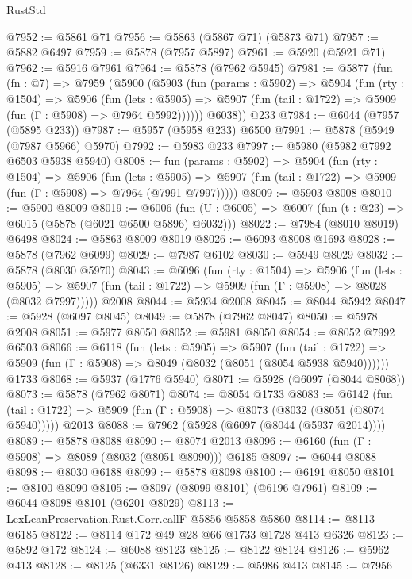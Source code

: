 \begin{lexlean}{RustStd}
\begin{coremodule}
@7952 := @5861 @71
@7956 := @5863 (@5867 @71) (@5873 @71)
@7957 := @5882 @6497
@7959 := @5878 (@7957 @5897)
@7961 := @5920 (@5921 @71)
@7962 := @5916 @7961
@7964 := @5878 (@7962 @5945)
@7981 := @5877
    (fun (fn : @7) =>
    @7959
      (@5900
        (@5903
          (fun (params : @5902) =>
          @5904
            (fun (rty : @1504) =>
            @5906
              (fun (lets : @5905) =>
              @5907 (fun (tail : @1722) => @5909 (fun (Γ : @5908) => @7964 @5992))))))
        @6038))
    @233
@7984 := @6044 (@7957 (@5895 @233))
@7987 := @5957 (@5958 @233) @6500
@7991 := @5878 (@5949 (@7987 @5966) @5970)
@7992 := @5983 @233
@7997 := @5980 (@5982 @7992 @6503 @5938 @5940)
@8008 := fun (params : @5902) =>
  @5904
    (fun (rty : @1504) =>
    @5906
      (fun (lets : @5905) =>
      @5907 (fun (tail : @1722) => @5909 (fun (Γ : @5908) => @7964 (@7991 @7997)))))
@8009 := @5903 @8008
@8010 := @5900 @8009
@8019 := @6006 (fun (U : @6005) => @6007 (fun (t : @23) => @6015 (@5878 (@6021 @6500 @5896) @6032)))
@8022 := @7984 (@8010 @8019) @6498
@8024 := @5863 @8009 @8019
@8026 := @6093 @8008 @1693
@8028 := @5878 (@7962 @6099)
@8029 := @7987 @6102
@8030 := @5949 @8029
@8032 := @5878 (@8030 @5970)
@8043 := @6096
    (fun (rty : @1504) =>
    @5906
      (fun (lets : @5905) =>
      @5907 (fun (tail : @1722) => @5909 (fun (Γ : @5908) => @8028 (@8032 @7997)))))
    @2008
@8044 := @5934 @2008
@8045 := @8044 @5942
@8047 := @5928 (@6097 @8045)
@8049 := @5878 (@7962 @8047)
@8050 := @5978 @2008
@8051 := @5977 @8050
@8052 := @5981 @8050
@8054 := @8052 @7992 @6503
@8066 := @6118
    (fun (lets : @5905) =>
    @5907
      (fun (tail : @1722) => @5909 (fun (Γ : @5908) => @8049 (@8032 (@8051 (@8054 @5938 @5940))))))
    @1733
@8068 := @5937 (@1776 @5940)
@8071 := @5928 (@6097 (@8044 @8068))
@8073 := @5878 (@7962 @8071)
@8074 := @8054 @1733
@8083 := @6142
    (fun (tail : @1722) => @5909 (fun (Γ : @5908) => @8073 (@8032 (@8051 (@8074 @5940)))))
    @2013
@8088 := @7962 (@5928 (@6097 (@8044 (@5937 @2014))))
@8089 := @5878 @8088
@8090 := @8074 @2013
@8096 := @6160 (fun (Γ : @5908) => @8089 (@8032 (@8051 @8090))) @6185
@8097 := @6044 @8088
@8098 := @8030 @6188
@8099 := @5878 @8098
@8100 := @6191 @8050
@8101 := @8100 @8090
@8105 := @8097 (@8099 @8101) (@6196 @7961)
@8109 := @6044 @8098 @8101 (@6201 @8029)
@8113 := LexLeanPreservation.Rust.Corr.callF @5856 @5858 @5860
@8114 := @8113 @6185
@8122 := @8114 @172 @49 @28 @66 @1733 @1728 @413 @6326
@8123 := @5892 @172
@8124 := @6088 @8123
@8125 := @8122 @8124
@8126 := @5962 @413
@8128 := @8125 (@6331 @8126)
@8129 := @5986 @413
@8145 := @7956

\end{coremodule}
\end{lexlean}

